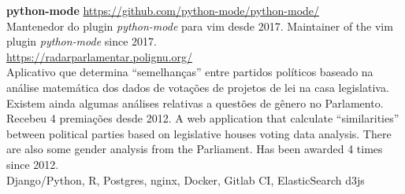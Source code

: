 \documentclass[]{friggeri-cv}
\begin{document}
\begin{entrylist}
\end{entrylist}%
%
%
\textbf{python-mode} \hfill \small{\href{https://github.com/python-mode/python-mode}{https://github.com/python-mode/python-mode/}}\\
\small{%
{Mantenedor do plugin \emph{python-mode} para vim desde 2017.}%
{Maintainer of the vim plugin \emph{python-mode} since 2017.}}\\

\textbf{} \hfill \small{\href{https://radarparlamentar.polignu.org/}{https://radarparlamentar.polignu.org/}}\\
\small{%
{Aplicativo que determina ``semelhanças'' entre partidos \nohyphens{políticos} baseado na análise matemática dos dados de votações de projetos de lei na casa \nohyphens{legislativa}. Existem ainda algumas análises relativas a questões de gênero no Parlamento.\\
Recebeu 4 premiações desde 2012.}%
{A web application that calculate ``similarities'' between political parties based on legislative houses voting data analysis. There are also some gender analysis from the Parliament.
Has been awarded 4 times since 2012.}}\\
\maintechs{} Django/Python, R, Postgres, nginx, Docker, Gitlab CI, ElasticSearch \eand{} d3js
\end{document}
